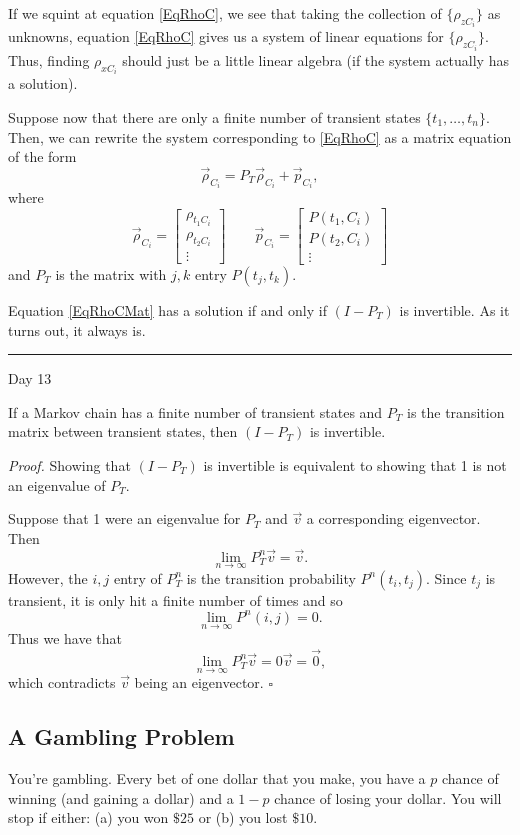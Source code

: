 \documentclass{problemset}
\newcommand{\mat}[1]{\begin{bmatrix}#1\end{bmatrix}}
\renewcommand{\P}{\mathbb{P}}
\newcommand{\fatrule}[1]{\vspace{.3cm}\hrule {\hfill \sf #1}\par}
\newenvironment{proof}{\emph{Proof.}}{\hfill$\square$}
\begin{document}
	If we squint at equation \eqref{EqRhoC}, we see that taking the collection of $\{\rho_{zC_i}\}$
	as unknowns, equation \eqref{EqRhoC} gives us a system of linear equations for $\{\rho_{zC_i}\}$.
	Thus, finding $\rho_{xC_i}$ should just be a little linear algebra (if the system actually has a solution).

	Suppose now that there are only a finite number of transient states $\{t_1,\ldots, t_n\}$.  Then, we can rewrite the
	system corresponding to \eqref{EqRhoC} as a matrix equation of the form
	\begin{equation}
		\label{EqRhoCMat}
		\vec \rho_{C_i} = P_T \vec \rho_{C_i} + \vec p_{C_i},
	\end{equation}
	where 
	\[
		\vec \rho_{C_i} = \mat{\rho_{t_1C_i}\\ \rho_{t_2C_i}\\\vdots}
		\qquad \vec p_{C_i} = \mat{P(t_1,C_i)\\P(t_2,C_i)\\\vdots}
	\]
	and $P_T$ is the matrix with $j,k$ entry $P(t_j,t_k)$.

	Equation \eqref{EqRhoCMat} has a solution if and only if $(I-P_T)$ is invertible.  As it turns
	out, it always is.

	\fatrule{Day 13}
	\begin{theorem}
		If a Markov chain has a finite number of transient states and $P_T$ is the transition
		matrix between transient states, then $(I-P_T)$ is invertible.
	\end{theorem}
	\begin{proof}
		Showing that $(I-P_T)$ is invertible is equivalent to showing that 1 is not an
		eigenvalue of $P_T$.

		Suppose that 1 were an eigenvalue for $P_T$ and $\vec v$ a corresponding eigenvector.
		Then
		\[
			\lim_{n\to\infty} P_T^n\vec v = \vec v.
		\]
		However, the $i,j$ entry of $P_T^n$ is the transition probability $P^n(t_i,t_j)$.
		Since $t_j$ is transient, it is only hit a finite number of times and so
		\[
			\lim_{n\to\infty} P^n(i,j) = 0.
		\]
		Thus we have that 
		\[
			\lim_{n\to\infty} P_T^n\vec v = 0\vec v=\vec 0,
		\]
		which contradicts $\vec v$ being an eigenvector.
	\end{proof}


\subsection*{A Gambling Problem}

	You're gambling. Every bet of one dollar that you make, you have a $p$ chance of winning
	(and gaining a dollar) and a $1-p$ chance of losing your dollar.  You will stop if either: (a)
	you won $\$25$ or (b) you lost $\$10$.
\end{document}
